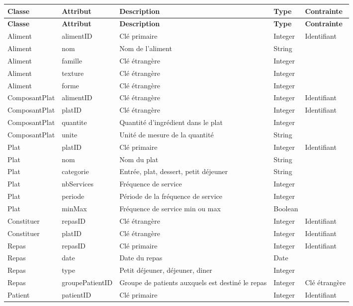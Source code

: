 \begin{longtable}{llp{5cm}ll}
  \hline
  \textbf{Classe} & \textbf{Attribut} & \textbf{Description} & \textbf{Type} & \textbf{Contrainte} \\ \endfirsthead \hline
  \textbf{Classe} & \textbf{Attribut} & \textbf{Description} & \textbf{Type} & \textbf{Contrainte} \\ \endhead \hline
  Aliment & alimentID & Clé primaire & Integer & Identifiant \\
  Aliment & nom & Nom de l'aliment & String & \\
  Aliment & famille & Clé étrangère & Integer & \\
  Aliment & texture & Clé étrangère & Integer & \\
  Aliment & forme & Clé étrangère & Integer & \\ \hline
  ComposantPlat & alimentID & Clé étrangère & Integer & Identifiant \\
  ComposantPlat & platID & Clé étrangère & Integer & Identifiant \\
  ComposantPlat & quantite & Quantité d'ingrédient dans le plat & Integer & \\
  ComposantPlat & unite & Unité de mesure de la quantité & String & \\ \hline
  Plat & platID & Clé primaire & Integer & Identifiant \\
  Plat & nom & Nom du plat & String & \\
  Plat & categorie & Entrée, plat, dessert, petit déjeuner & String & \\
  Plat & nbServices & Fréquence de service & Integer & \\
  Plat & periode & Période de la fréquence de service & Integer & \\
  Plat & minMax & Fréquence de service min ou max & Boolean & \\ \hline
  Constituer & repasID & Clé étrangère & Integer & Identifiant \\
  Constituer & platID & Clé étrangère & Integer & Identifiant \\ \hline
  Repas & repasID & Clé primaire & Integer & Identifiant \\
  Repas & date & Date du repas & Date &  \\
  Repas & type & Petit déjeuner, déjeuner, diner & Integer \\
  Repas & groupePatientID &  Groupe de patients auxquels est destiné le repas & Integer & Clé étrangère \\ \hline
  Patient & patientID & Clé primaire & Integer & Identifiant \\

\end{longtable}
